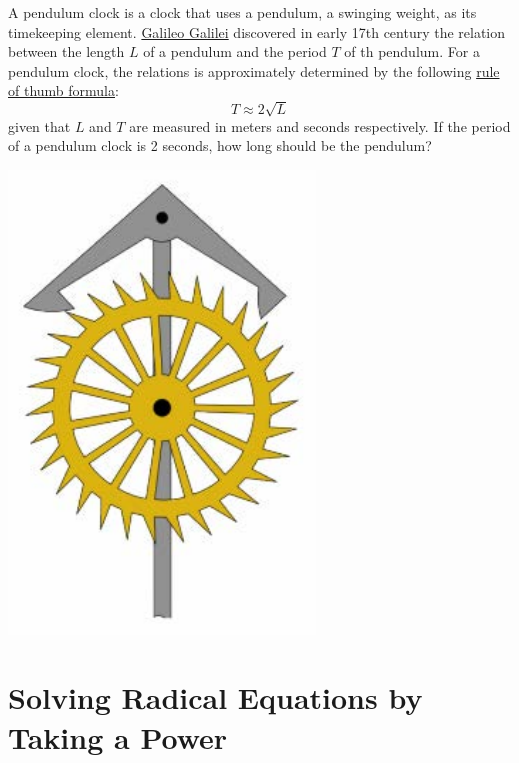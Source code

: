 \documentclass[
  en,11pt]{elegantbook}
\newcommand{\size}[2]{{\fontsize{#1}{0}\selectfont#2}}
\newenvironment{rmdthink}{
	\vspace*{0.5\baselineskip}
	\par\noindent
	\makebox[-4pt][r]{\color{green!90}\size{12}{\faLightbulbO}\,\,}
    \begin{tcolorbox}[
    enhanced,
    title={\textbf{\color{second}Think}},
    title style={left color=blue!10!green!20!white,right color=yellow!20!blue!20!white},
    colback=green!20!white,
    ]
    \sffamily
}{
    \end{tcolorbox}
	\par\ignorespacesafterend
}
\begin{document}
\begin{rmdthink}

\begin{multicols}{2}

A pendulum clock is a clock that uses a pendulum, a swinging weight, as its timekeeping element. \href{https://en.wikipedia.org/wiki/Galileo_Galilei}{Galileo Galilei} discovered in early 17th century the relation between the length \(L\) of a pendulum and the period \(T\) of th pendulum. For a pendulum clock, the relations is approximately determined by the following \href{https://en.wikipedia.org/wiki/Pendulum_(mathematics)}{rule of thumb formula}:
\[
T\approx 2\sqrt{L}
\]
given that \(L\) and \(T\) are measured in meters and seconds respectively. If the period of a pendulum clock is 2 seconds, how long should be the pendulum?

\begin{center}\includegraphics[width=0.6\linewidth]{figs/pendulum-clock} \end{center}

\end{multicols}

\end{rmdthink}

\hypertarget{solving-radical-equations-by-taking-a-power}{%
\section{Solving Radical Equations by Taking a Power}\label{solving-radical-equations-by-taking-a-power}}
\end{document}
